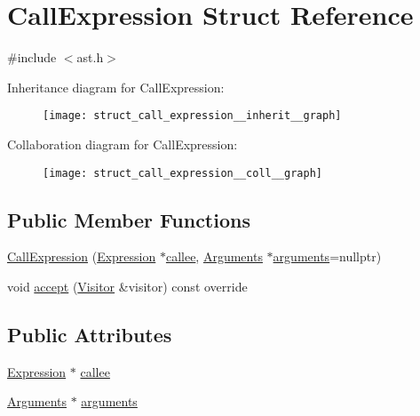 \hypertarget{struct_call_expression}{}\section{Call\+Expression Struct Reference}
\label{struct_call_expression}


{\ttfamily \#include $<$ast.\+h$>$}



Inheritance diagram for Call\+Expression\+:
\nopagebreak
\begin{figure}[H]
\begin{center}
\leavevmode
\texttt{[image: struct\_call\_expression\_\_inherit\_\_graph]}
\end{center}
\end{figure}


Collaboration diagram for Call\+Expression\+:
\nopagebreak
\begin{figure}[H]
\begin{center}
\leavevmode
\texttt{[image: struct\_call\_expression\_\_coll\_\_graph]}
\end{center}
\end{figure}
\subsection*{Public Member Functions}
\begin{DoxyCompactItemize}
\item 
\hyperlink{struct_call_expression_a7e6da0437a5f82430af5f31779b830d7}{Call\+Expression} (\hyperlink{struct_expression}{Expression} $\ast$\hyperlink{struct_call_expression_a2d77ccd1a2d6f34d718063f0eb47bc21}{callee}, \hyperlink{struct_arguments}{Arguments} $\ast$\hyperlink{struct_call_expression_ad2dad57df529ef1ef06b43cd438598bd}{arguments}=nullptr)
\item 
void \hyperlink{struct_call_expression_a5be626b61944a97f2a6015b632432513}{accept} (\hyperlink{struct_visitor}{Visitor} \&visitor) const override
\end{DoxyCompactItemize}
\subsection*{Public Attributes}
\begin{DoxyCompactItemize}
\item 
\hyperlink{struct_expression}{Expression} $\ast$ \hyperlink{struct_call_expression_a2d77ccd1a2d6f34d718063f0eb47bc21}{callee}
\item 
\hyperlink{struct_arguments}{Arguments} $\ast$ \hyperlink{struct_call_expression_ad2dad57df529ef1ef06b43cd438598bd}{arguments}
\end{DoxyCompactItemize}


